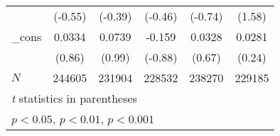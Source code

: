 {\begin{longtable}{l*{5}{c}}
            &     (-0.55)         &     (-0.39)         &     (-0.46)         &     (-0.74)         &      (1.58)         \\
\_cons      &      0.0334         &      0.0739         &      -0.159         &      0.0328         &      0.0281         \\
            &      (0.86)         &      (0.99)         &     (-0.88)         &      (0.67)         &      (0.24)         \\
\hline
\(N\)       &      244605         &      231904         &      228532         &      238270         &      229185         \\
\hline\hline
\multicolumn{6}{l}{\footnotesize \textit{t} statistics in parentheses}\\
\multicolumn{6}{l}{\footnotesize \sym{*} \(p<0.05\), \sym{**} \(p<0.01\), \sym{***} \(p<0.001\)}\\
\end{longtable}
\label{tab:oaxaca_male}
}
